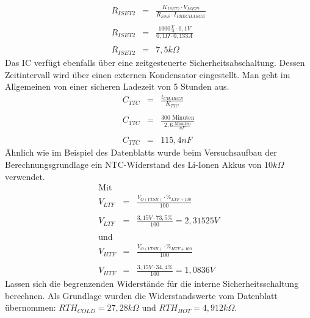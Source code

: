 \documentclass[12pt]{scrreprt} %
\begin{document}
\begin{eqnarray}
R_{ISET2}&=&\frac{K_{ISET2} \cdot V_{ISET2}}{R_{SNS} \cdot I_{PRECHARGE}}\\
 \nonumber \\
R_{ISET2}&=&\frac{1000 \frac{V}{A} \cdot 0,1V}{0,1\Omega \cdot 0,133A}\\
 \nonumber \\
R_{ISET2}&=&7,5k\Omega
\end{eqnarray}
Das IC verfügt ebenfalls über eine zeitgesteuerte Sicherheitsabschaltung. Dessen Zeitintervall wird über einen externen Kondensator eingestellt. Man geht im Allgemeinen von einer sicheren Ladezeit von 5 Stunden aus. 
\begin{eqnarray}
C_{TTC}&=&\frac{t_{CHARGE}}{K_{TTC}}\\
\nonumber\\
C_{TTC}&=&\frac{300 \text{ Minuten} }{2,6 \frac{\text{ Minuten}}{nF}}\\
\nonumber\\
C_{TTC}&=& 115,4 nF
\end{eqnarray}
Ähnlich wie im Beispiel des Datenblatts wurde beim Versuchsaufbau der Berechnungsgrundlage ein NTC-Widerstand des Li-Ionen Akkus von $10k\Omega$  verwendet.\\
\begin{eqnarray}
\text{Mit }&& \nonumber\\
V_{LTF}&=&\frac{V_{O(VTSB)} \cdot \%_{LTF+100}}{100}\\
\nonumber\\
V_{LTF}&=&\frac{3,15V \cdot 73,5\%}{100} = 2,31525V\\
\nonumber\\
\text{und } && \nonumber\\
V_{HTF}&=&\frac{V_{O(VTSB)} \cdot \%_{HTF+100}}{100}\\
\nonumber\\
V_{HTF}&=&\frac{3,15V \cdot 34,4\%}{100} = 1,0836V
\end{eqnarray}
Lassen sich die begrenzenden Widerstände für die interne Sicherheitsschaltung berechnen. Als Grundlage wurden die Widerstandswerte vom Datenblatt übernommen: $RTH_{COLD} = 27,28k\Omega$ und $RTH_{HOT} = 4,912k\Omega$.
\end{document}
